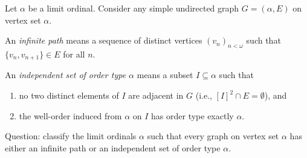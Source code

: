 \par
Let $\alpha$ be a limit ordinal. Consider any simple undirected graph $G=(\alpha,E)$ on vertex set $\alpha$.

An \emph{infinite path} means a sequence of distinct vertices $(v_n)_{n<\omega}$ such that $\{v_n,v_{n+1}\}\in E$ for all $n$.

An \emph{independent set of order type $\alpha$} means a subset $I\subseteq\alpha$ such that
\begin{enumerate}
\item no two distinct elements of $I$ are adjacent in $G$ (i.e., $[I]^2\cap E=\emptyset$), and
\item the well-order induced from $\alpha$ on $I$ has order type exactly $\alpha$.
\end{enumerate}

Question: classify the limit ordinals $\alpha$ such that every graph on vertex set $\alpha$ has either an infinite path or an independent set of order type $\alpha$.
